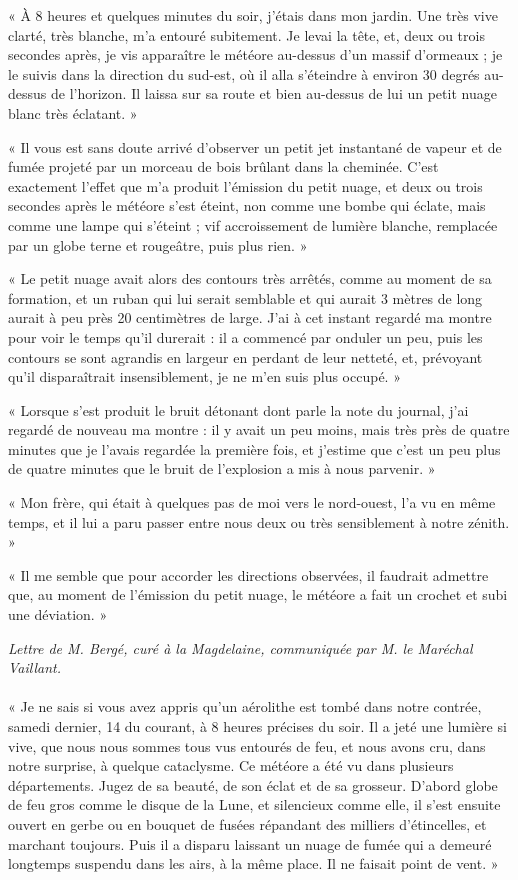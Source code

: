 \documentclass[a4paper, 11pt, oneside, polutonikogreek, french]{article}
\begin{document}
« À 8 heures et quelques minutes du soir, j'étais dans mon jardin. Une très vive clarté, très blanche, m'a entouré subitement. Je levai la tête, et, deux ou trois secondes après, je vis apparaître le météore au-dessus d'un massif d'ormeaux ; je le suivis dans la direction du sud-est, où il alla s'éteindre à environ 30 degrés au-dessus de l'horizon. Il laissa sur sa route et bien au-dessus de lui un petit nuage blanc très éclatant. »

« Il vous est sans doute arrivé d'observer un petit jet instantané de vapeur et de fumée projeté par un morceau de bois brûlant dans la cheminée. C'est exactement l'effet que m'a produit l'émission du petit nuage, et deux ou trois secondes après le météore s'est éteint, non comme une bombe qui éclate, mais comme une lampe qui s'éteint ; vif accroissement de lumière blanche, remplacée par un globe terne et rougeâtre, puis plus rien. »

« Le petit nuage avait alors des contours très arrêtés, comme au moment de sa formation, et un ruban qui lui serait semblable et qui aurait 3 mètres de long aurait à peu près 20 centimètres de large. J'ai à cet instant regardé ma montre pour voir le temps qu'il durerait : il a commencé par onduler un peu, puis les contours se sont agrandis en largeur en perdant de leur netteté, et, prévoyant qu'il disparaîtrait insensiblement, je ne m'en suis plus occupé. »

« Lorsque s'est produit le bruit détonant dont parle la note du journal, j'ai regardé de nouveau ma montre : il y avait un peu moins, mais très près de quatre minutes que je l'avais regardée la première fois, et j'estime que c'est un peu plus de quatre minutes que le bruit de l'explosion a mis à nous parvenir. »

« Mon frère, qui était à quelques pas de moi vers le nord-ouest, l'a vu en même temps, et il lui a paru passer entre nous deux ou très sensiblement à notre zénith. »

« Il me semble que pour accorder les directions observées, il faudrait admettre que, au moment de l'émission du petit nuage, le météore a fait un crochet et subi une déviation. »
\begin{center}
\emph{Lettre de M. Bergé, curé à la Magdelaine, communiquée par M. le Maréchal Vaillant.}
\end{center}
\paragraph{}
« Je ne sais si vous avez appris qu'un aérolithe est tombé dans notre contrée, samedi dernier, 14 du courant, à 8 heures précises du soir. Il a jeté une lumière si vive, que nous nous sommes tous vus entourés de feu, et nous avons cru, dans notre surprise, à quelque cataclysme. Ce météore a été vu dans plusieurs départements. Jugez de sa beauté, de son éclat et de sa grosseur. D'abord globe de feu gros comme le disque de la Lune, et silencieux comme elle, il s'est ensuite ouvert en gerbe ou en bouquet de fusées répandant des milliers d'étincelles, et marchant toujours. Puis il a disparu laissant un nuage de fumée qui a demeuré longtemps suspendu dans les airs, à la même place. Il ne faisait point de vent. »
\end{document}
